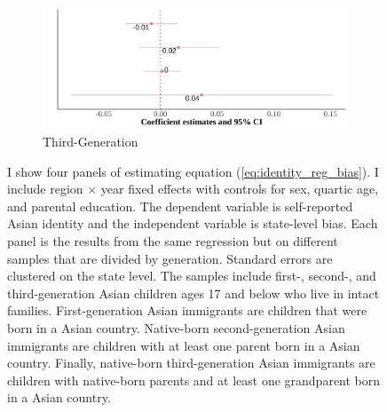 \documentclass[12pt,english]{article}
\begin{document}
\begin{center}
\begin{figure}[!htb]
\begin{subfigure}{.48\textwidth}
\caption{Third-Generation}
\centering
\includegraphics[width=.9\linewidth]{figure/county-skin-iat-regression-third-gen.png}
\end{subfigure}
\caption*{\footnotesize{I show four panels of estimating equation (\ref{eq:identity_reg_bias}). I include region $\times$ year fixed effects with controls for sex, quartic age, and parental education. The dependent variable is self-reported Asian identity and the independent variable is state-level bias. Each panel is the results from the same regression but on different samples that are divided by generation. Standard errors are clustered on the state level. The samples include first-, second-, and third-generation Asian children ages 17 and below who live in intact families. First-generation Asian immigrants are children that were born in a Asian country. Native-born second-generation Asian immigrants are children with at least one parent born in a Asian country. Finally, native-born third-generation Asian immigrants are children with native-born parents and at least one grandparent born in a Asian country.}}
\end{figure}
\end{center}

\pagebreak
\newpage
\end{document}
